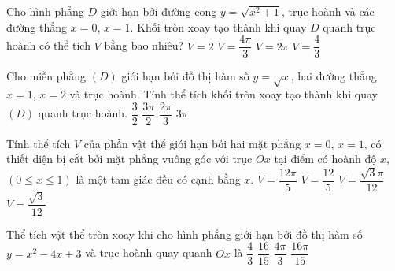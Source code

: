 \begin{ex}%
	Cho hình phẳng $D$ giới hạn bởi đường cong $y=\sqrt{x^2+1}$, trục hoành và các đường thẳng $x=0$, $x=1$. Khối tròn xoay tạo thành khi quay  $D$ quanh trục hoành có thể tích $V$ bằng bao nhiêu?
	\choice 
		 {$V=2$}
		{\True  $V=\dfrac{4 \pi}{3}$}
		{$V=2  \pi$}
		 {$V=\dfrac{4}{3}$}
\end{ex}

\begin{ex}%
	 Cho miền phẳng $(D)$ giới hạn bởi đồ thị hàm số $y=\sqrt{x}$, hai đường thẳng $x=1$, $x=2$ và trục hoành. Tính thể tích khối tròn xoay tạo thành khi quay $(D)$ quanh trục hoành.
	 \choice
		 {$\dfrac{3}{2}$}
		 {\True $\dfrac{3\pi}{2}$}
		 {$\dfrac{2\pi}{3}$}
		{$3\pi$} 
\end{ex}

\begin{ex}%
	Tính thể tích $V$ của phần vật thể giới hạn bởi hai mặt phẳng $x=0$, $x=1$, có thiết diện bị cắt bởi mặt phẳng vuông góc với trục $Ox$ tại điểm có hoành độ $x$,  $(0\le x\le 1)$ là một tam giác đều có cạnh bằng $x$.
	\choice 
		 {$V=\dfrac{12\pi}{5}$}
		{$V=\dfrac{12}{5}$} 
		{$V=\dfrac{\sqrt{3} \pi}{12}$} 
		 {\True $V=\dfrac{\sqrt{3}}{12}$}
\end{ex}

\begin{ex}%
	Thể tích  vật thể tròn xoay khi cho hình phẳng giới hạn bởi đồ thị hàm số $y=x^2-4x+3$ và trục hoành quay quanh $Ox$ là
	\choice 
		 {$\dfrac{4}{3}$}
		{$\dfrac{16}{15}$} 
		 {$\dfrac{4\pi}{3}$}
		{\True  $\dfrac{16\pi}{15}$}
\end{ex}

